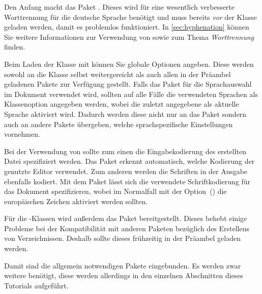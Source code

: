 \documentclass[%
  english,ngerman,%
  cdgeometry=no,DIV=12,automark,%
]{tudscrartcl}
\begin{document}
Den Anfang macht das Paket . Dieses wird für eine wesentlich 
verbesserte Worttrennung für die deutsche Sprache benötigt und muss bereits 
\emph{vor} der Klasse geladen werden, damit es problemlos funktioniert. In 
\autoref{sec:hyphenation} können Sie weitere Informationen zur Verwendung von 
 sowie zum Thema \emph{Worttrennung} finden.
%
\begin{Preamble}
\RequirePackage[ngerman=ngerman-x-latest]{hyphsubst}
\end{Preamble}
%
Beim Laden der Klasse mit  können Sie globale Optionen 
angeben. Diese werden sowohl an die Klasse selbst weitergereicht als auch allen 
in der Präambel geladenen Pakete zur Verfügung gestellt. Falls das Paket 
 für die Sprachauswahl im Dokument verwendet wird, sollten auf 
alle Fälle die verwendeten Sprachen als Klassenoption angegeben werden, wobei 
die zuletzt angegebene als aktuelle Sprache aktiviert wird. Dadurch werden 
diese nicht nur an das Paket  sondern auch an andere Pakete 
übergeben, welche sprachspezifische Einstellungen vornehmen.
%
%
Bei der Verwendung von  sollte zum einen die Eingabekodierung 
des erstellten Datei spezifiziert werden. Das Paket  erkennt 
automatisch, welche Kodierung der genutzte Editor verwendet. Zum anderen werden 
die Schriften in der Ausgabe ebenfalls kodiert. Mit dem Paket  
lässt sich die verwendete Schriftkodierung für das Dokument spezifizieren, 
wobei im Normalfall mit der Option~() die 
europäischen Zeichen aktiviert werden sollten.
%
\begin{Preamble}
\usepackage{selinput}
\usepackage[T1]{fontenc}
\end{Preamble}
%
Für die \KOMAScript-Klassen wird außerdem das Paket  
bereitgestellt. Dieses behebt einige Probleme bei der Kompatibilität mit 
anderen Paketen bezüglich des Erstellens von Verzeichnissen. Deshalb sollte 
dieses frühzeitig in der Präambel geladen werden. 
%
\begin{Preamble}
\usepackage{scrhack}
\end{Preamble}
%
Damit sind die allgemein notwendigen Pakete eingebunden. Es werden zwar weitere 
benötigt, diese werden allerdings in den einzelnen Abschnitten dieses Tutorials 
aufgeführt.
\end{document}
